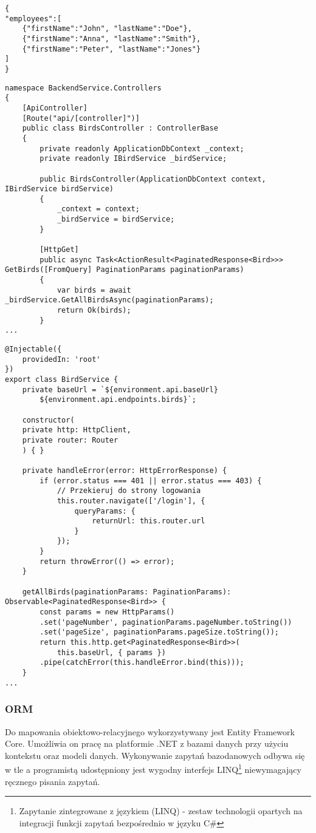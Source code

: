 \begin{lstlisting}[style=tsstyle, caption=Przykład danych w formacie JSON]
{
"employees":[
	{"firstName":"John", "lastName":"Doe"},
	{"firstName":"Anna", "lastName":"Smith"},
	{"firstName":"Peter", "lastName":"Jones"}
]
}
\end{lstlisting}

\begin{lstlisting}[style=csharp, caption={Fragment kontrolera REST API z projektu}, label={lst:przykladCSController}]
namespace BackendService.Controllers
{
	[ApiController]
	[Route("api/[controller]")]
	public class BirdsController : ControllerBase
	{
		private readonly ApplicationDbContext _context;
		private readonly IBirdService _birdService;

		public BirdsController(ApplicationDbContext context, IBirdService birdService)
		{
			_context = context;
			_birdService = birdService;
		}

		[HttpGet]
		public async Task<ActionResult<PaginatedResponse<Bird>>> GetBirds([FromQuery] PaginationParams paginationParams)
		{
			var birds = await _birdService.GetAllBirdsAsync(paginationParams);
			return Ok(birds);
		}
...
\end{lstlisting}

\begin{lstlisting}[style=tsstyle, caption={Fragment serwisu po stronie frontendu}, label={lst:przykladTSService}]
@Injectable({
	providedIn: 'root'
})
export class BirdService {
	private baseUrl = `${environment.api.baseUrl}
		${environment.api.endpoints.birds}`;
	
	constructor(
	private http: HttpClient,
	private router: Router
	) { }
	
	private handleError(error: HttpErrorResponse) {
		if (error.status === 401 || error.status === 403) {
			// Przekieruj do strony logowania
			this.router.navigate(['/login'], { 
				queryParams: { 
					returnUrl: this.router.url 
				}
			});
		}
		return throwError(() => error);
	}
	
	getAllBirds(paginationParams: PaginationParams): Observable<PaginatedResponse<Bird>> {
		const params = new HttpParams()
		.set('pageNumber', paginationParams.pageNumber.toString())
		.set('pageSize', paginationParams.pageSize.toString());
		return this.http.get<PaginatedResponse<Bird>>(
			this.baseUrl, { params })
		.pipe(catchError(this.handleError.bind(this)));
	}
...
\end{lstlisting}

\subsubsection{ORM}
Do mapowania obiektowo-relacyjnego wykorzystywany jest Entity Framework Core. Umożliwia on pracę na platformie .NET z bazami danych przy użyciu kontekstu oraz modeli danych. Wykonywanie zapytań bazodanowych odbywa się w tle a programistą udostępniony jest wygodny interfejs LINQ\footnote{Zapytanie zintegrowane z językiem (LINQ) - zestaw technologii opartych na integracji funkcji zapytań bezpośrednio w języku C\#\cite{dotnet_linq}} niewymagający ręcznego pisania zapytań.

